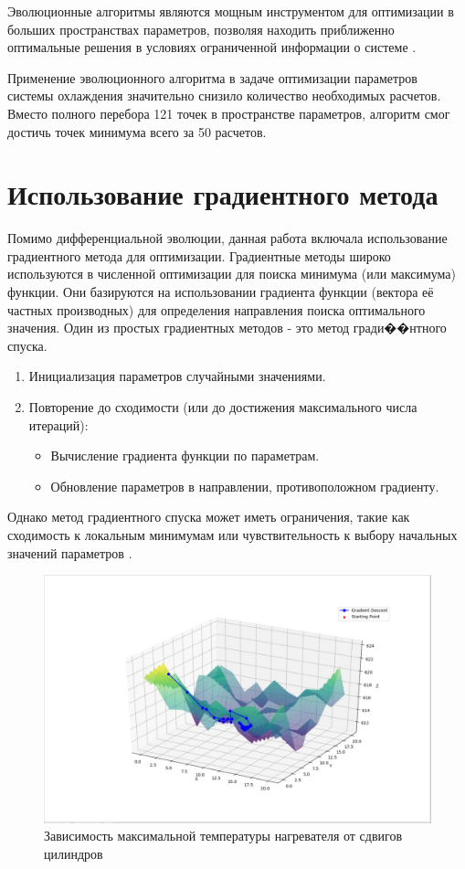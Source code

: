 \documentclass[a4paper,12pt]{extreport}
\numberwithin{equation}{chapter}
\begin{document}
Эволюционные алгоритмы являются мощным инструментом для оптимизации в больших пространствах параметров, позволяя находить приближенно оптимальные решения в условиях ограниченной информации о системе \cite{evolution}.

Применение эволюционного алгоритма в задаче оптимизации параметров системы охлаждения значительно снизило количество необходимых расчетов. Вместо полного перебора 121 точек в пространстве параметров, алгоритм смог достичь точек минимума всего за 50 расчетов.

\section{Использование градиентного метода}

Помимо дифференциальной эволюции, данная работа включала использование градиентного метода для оптимизации. Градиентные методы широко используются в численной оптимизации для поиска минимума (или максимума) функции. Они базируются на использовании градиента функции (вектора её частных производных) для определения направления поиска оптимального значения. Один из простых градиентных методов - это метод гради��нтного спуска.

\begin{enumerate}
	\item Инициализация параметров случайными значениями.
	\item Повторение до сходимости (или до достижения максимального числа итераций):
	      \begin{itemize}
		      \item Вычисление градиента функции по параметрам.
		      \item Обновление параметров в направлении, противоположном градиенту.
	      \end{itemize}
\end{enumerate}

Однако метод градиентного спуска может иметь ограничения, такие как сходимость к локальным минимумам или чувствительность к выбору начальных значений параметров \cite{Chernyshev2007}.

\begin{figure}[h]
	\begin{center}
		\includegraphics[width=0.4\linewidth]{images/24.jpg}
		\caption{Зависимость максимальной температуры нагревателя от сдвигов цилиндров} %
	\end{center}
\end{figure}
\end{document}
